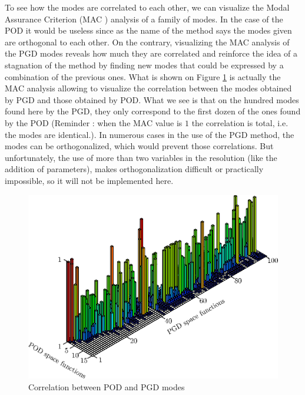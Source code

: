 \documentclass[12pt,a4paper]{article}
\begin{document}
To see how the modes are correlated to each other, we can visualize the Modal Assurance Criterion (MAC \cite{allemang2003modal}) analysis of a family of modes. In the case of the POD it would be useless since as the name of the method says the modes given are orthogonal to each other. On the contrary, visualizing the MAC analysis of the PGD modes reveals how much they are correlated and reinforce the idea of a stagnation of the method by finding new modes that could be expressed by a combination of the previous ones. What is shown on Figure \ref{AnalyseDeMAC} is actually the MAC analysis allowing to visualize the correlation between the modes obtained by PGD and those obtained by POD. What we see is that on the hundred modes found here by the PGD, they only correspond to the first dozen of the ones found by the POD (Reminder : when the MAC value is $1$ the correlation is total, i.e. the modes are identical.).
In numerous cases in the use of the PGD method, the modes can be orthogonalized, which would prevent those correlations. But unfortunately, the use of more than two variables in the resolution (like the addition of parameters), makes orthogonalization difficult or practically impossible, so it will not be implemented here.

\begin{figure}[!ht]
\centering
\includegraphics[width=0.8\linewidth]{Images/MAC.POD.PGD.eps}
\caption{Correlation between POD and PGD modes \label{AnalyseDeMAC}}
\end{figure}
\end{document}
